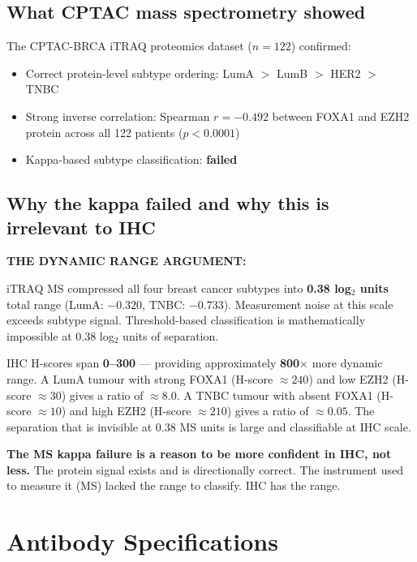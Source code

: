 \documentclass[11pt, a4paper]{article}
\begin{document}
\subsection{What CPTAC mass spectrometry showed}

The CPTAC-BRCA iTRAQ proteomics dataset
($n=122$) confirmed:
\begin{itemize}
    \item Correct protein-level subtype ordering:
    LumA $>$ LumB $>$ HER2 $>$ TNBC
    \item Strong inverse correlation:
    Spearman $r=-0.492$ between FOXA1 and
    EZH2 protein across all 122 patients
    ($p<0.0001$)
    \item Kappa-based subtype classification:
    \textbf{failed}
\end{itemize}

\subsection{Why the kappa failed and why this
is irrelevant to IHC}

\begin{mdframed}[backgroundcolor=dynamicbox,
                 linecolor=green!60!black,
                 linewidth=1pt]
\textbf{THE DYNAMIC RANGE ARGUMENT:}

iTRAQ MS compressed all four breast cancer
subtypes into \textbf{0.38 log$_2$ units}
total range (LumA: $-0.320$, TNBC: $-0.733$).
Measurement noise at this scale exceeds subtype
signal. Threshold-based classification is
mathematically impossible at 0.38 log$_2$
units of separation.

IHC H-scores span \textbf{0--300} ---
providing approximately \textbf{800$\times$}
more dynamic range. A LumA tumour with strong
FOXA1 (H-score $\approx 240$) and low EZH2
(H-score $\approx 30$) gives a ratio of
$\approx 8.0$. A TNBC tumour with absent
FOXA1 (H-score $\approx 10$) and high EZH2
(H-score $\approx 210$) gives a ratio of
$\approx 0.05$. The separation that is
invisible at 0.38 MS units is large and
classifiable at IHC scale.

\textbf{The MS kappa failure is a reason
to be more confident in IHC, not less.}
The protein signal exists and is directionally
correct. The instrument used to measure it
(MS) lacked the range to classify. IHC has
the range.
\end{mdframed}

\section{Antibody Specifications}
\end{document}
